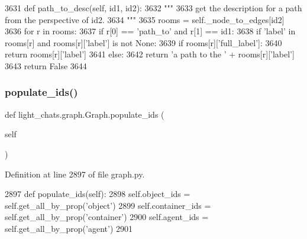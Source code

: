 \begin{DoxyCode}
3631     \textcolor{keyword}{def }path\_to\_desc(self, id1, id2):
3632         \textcolor{stringliteral}{"""}
3633 \textcolor{stringliteral}{        get the description for a path from the perspective of id2.}
3634 \textcolor{stringliteral}{        """}
3635         rooms = self.\_node\_to\_edges[id2]
3636         \textcolor{keywordflow}{for} r \textcolor{keywordflow}{in} rooms:
3637             \textcolor{keywordflow}{if} r[0] == \textcolor{stringliteral}{'path\_to'} \textcolor{keywordflow}{and} r[1] == id1:
3638                 \textcolor{keywordflow}{if} \textcolor{stringliteral}{'label'} \textcolor{keywordflow}{in} rooms[r] \textcolor{keywordflow}{and} rooms[r][\textcolor{stringliteral}{'label'}] \textcolor{keywordflow}{is} \textcolor{keywordflow}{not} \textcolor{keywordtype}{None}:
3639                     \textcolor{keywordflow}{if} rooms[r][\textcolor{stringliteral}{'full\_label'}]:
3640                         \textcolor{keywordflow}{return} rooms[r][\textcolor{stringliteral}{'label'}]
3641                     \textcolor{keywordflow}{else}:
3642                         \textcolor{keywordflow}{return} \textcolor{stringliteral}{'a path to the '} + rooms[r][\textcolor{stringliteral}{'label'}]
3643         \textcolor{keywordflow}{return} \textcolor{keyword}{False}
3644 
\end{DoxyCode}
\mbox{\label{classlight__chats_1_1graph_1_1Graph_a604091edb800be1aad16f3a64f13d6da}} 
\subsubsection{\texorpdfstring{populate\+\_\+ids()}{populate\_ids()}}
{\footnotesize\ttfamily def light\+\_\+chats.\+graph.\+Graph.\+populate\+\_\+ids (\begin{DoxyParamCaption}\item[{}]{self }\end{DoxyParamCaption})}



Definition at line 2897 of file graph.\+py.


\begin{DoxyCode}
2897     \textcolor{keyword}{def }populate\_ids(self):
2898         self.object\_ids = self.get\_all\_by\_prop(\textcolor{stringliteral}{'object'})
2899         self.container\_ids = self.get\_all\_by\_prop(\textcolor{stringliteral}{'container'})
2900         self.agent\_ids = self.get\_all\_by\_prop(\textcolor{stringliteral}{'agent'})
2901 
\end{DoxyCode}
\mbox{\label{classlight__chats_1_1graph_1_1Graph_aa40b8fea9737da5d3f329dfb00c42c6f}} 

